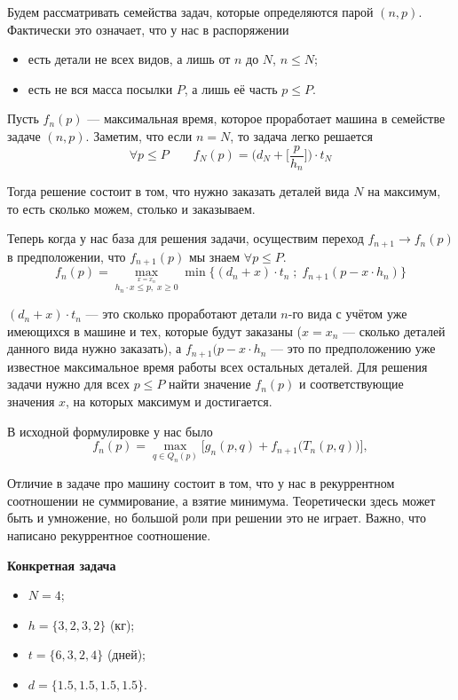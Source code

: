 \bigskip

Будем рассматривать семейства задач, которые определяются парой $(n, p)$. Фактически это означает, что у нас в распоряжении
\begin{itemize}[nosep]
	\item есть детали не всех видов, а лишь от $n$ до $N$, $n \le N$;
	
	\item есть не вся масса посылки $P$, а лишь её часть $p \le P$.
\end{itemize}

Пусть $f_n(p)$ --- максимальная время, которое проработает машина в семействе задаче $(n, p)$. Заметим, что если $n = N$, то задача легко решается
\[
	\forall p \le P \qquad f_N(p) = \bigg(d_N + \bigg[\frac{p}{h_n}\bigg]\bigg) \cdot t_N
\]

Тогда решение состоит в том, что нужно заказать деталей вида $N$ на максимум, то есть сколько можем, столько и заказываем.

Теперь когда у нас база для решения задачи, осуществим переход $f_{n+1} \to f_n(p)$ в предположении, что $f_{n+1}(p)$ мы знаем $\forall p \le P$.
\[
	\boxed{f_n(p) = \max_{\stackrel{x = x_n}{h_n \cdot x \le p, \; x \ge 0}} \min\Big\{(d_n + x) \cdot t_n \; ; \; f_{n+1}(p - x \cdot h_n)\Big\}}
\]

$(d_n + x) \cdot t_n$ --- это сколько проработают детали $n$-го вида с учётом уже имеющихся в машине и тех, которые будут заказаны ($x = x_n$ --- сколько деталей данного вида нужно заказать), а $f_{n+1}(p - x \cdot h_n$ --- это по предположению уже известное максимальное время работы всех остальных деталей. Для решения задачи нужно для всех $p \le P$ найти значение $f_n(p)$ и соответствующие значения $x$, на которых максимум и достигается.

В исходной формулировке у нас было
\[
	f_n(p) = \max_{q \in Q_{n}(p)} \Big[g_n(p, q) + f_{n+1}\big(T_{n}(p, q)\big)\Big],
\]

Отличие в задаче про машину состоит в том, что у нас в рекуррентном соотношении не суммирование, а взятие минимума. Теоретически здесь может быть и умножение, но большой роли при решении это не играет. Важно, что написано рекуррентное соотношение.


\textbf{Конкретная задача}

\begin{itemize}
	\item $N = 4$;
	
	\item $h = \{3, 2, 3, 2\}$ (кг);
	
	\item $t = \{6, 3, 2, 4\}$ (дней);
	
	\item $d = \{1.5, 1.5, 1.5, 1.5\}$.
\end{itemize}

